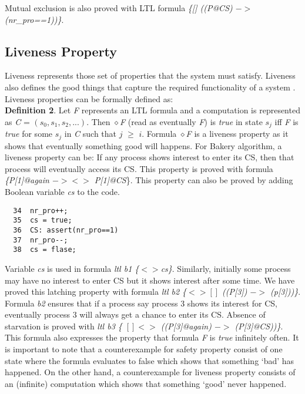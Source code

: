 \documentclass[conference]{IEEEtran}
\begin{document}
Mutual exclusion is also proved with LTL formula \emph{\{[] ((P@CS) $->$ (nr\_pro==1))\}}.

\subsection{Liveness Property}
Liveness represents those set of properties that the system must satisfy. Liveness also defines the good things that capture the 
required functionality of a system \cite{7}. Liveness properties can be formally defined as:\\
\textbf{Definition 2}. Let \emph{F} represents an LTL formula and a computation is represented as \emph{C} = $(s_0, s_1, s_2,...)$. 
Then $\diamond$\emph{F} (read as eventually \emph{F}) is \emph{true} in state $s_j$ iff \emph{F} is \emph{true} for some $s_j$ in \emph{C} such that 
$j$ $\geq$ $i$.
Formula $\diamond$\emph{F} is a liveness property as it shows that eventually something good will happens. For Bakery algorithm, a liveness property 
can be: If any process shows interest to enter its CS, then that process will eventually access its CS. This property is proved with 
formula \emph{\{P[1]@again  $-> <>$ P[1]@CS}\}. This property can also be proved by adding Boolean variable \emph{cs} to the code.
{\small \begin{verbatim}
  34  nr_pro++;
  35  cs = true;
  36  CS: assert(nr_pro==1)
  37  nr_pro--;
  38  cs = flase; 
\end{verbatim}}

Variable \emph{cs} is used in formula \emph{ltl b1 \{$<>$cs\}}. Similarly, initially some process may have no interest to enter CS but it shows interest after 
some time. We have proved this latching property with formula \emph{ltl b2 \{$<>[ ]$ ((P[3]\@again) $->$ (p[3]\@CS))\}}. Formula \emph{b2} ensures that if a 
process say process 3 shows its interest for CS, eventually process 3 will always get a chance to enter its CS. 
Absence of starvation is proved with \emph{ltl b3 \{ $[ ] <>$ ((P[3]@again) $->$ (P[3]@CS))\}}. This formula also expresses the property that formula \emph{F} 
is \emph{true} infinitely often. It is important to note that a counterexample for safety property consist of one state where the 
formula evaluates to false which shows that something ‘bad’ has happened. On the other hand, a counterexample for liveness property consists 
of an (infinite) computation which shows that something ‘good’ never happened.
\end{document}
